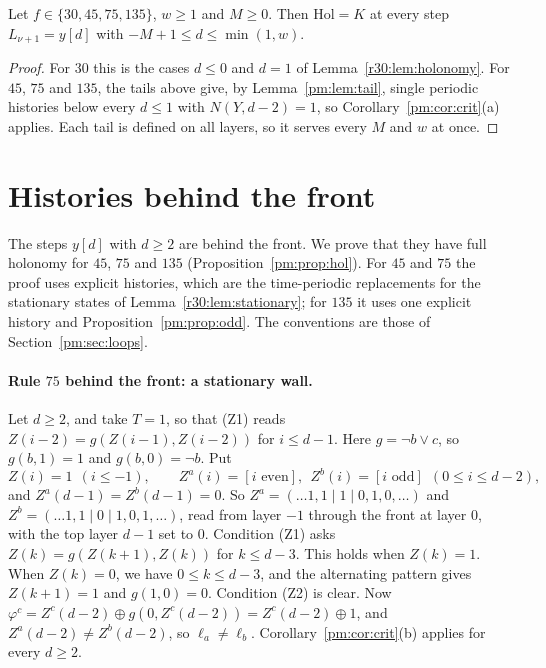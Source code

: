 \begin{proposition}\label{pm:prop:ahead}
Let $f\in\{30,45,75,135\}$, $w\ge1$ and $M\ge0$. Then $\mathrm{Hol}=K$ at every step $L_{\nu+1}=y[d]$ with $-M+1\le d\le\min(1,w)$.
\end{proposition}

\begin{proof}
For $30$ this is the cases $d\le0$ and $d=1$ of Lemma~\ref{r30:lem:holonomy}. For $45$, $75$ and $135$, the tails above give, by Lemma~\ref{pm:lem:tail}, single periodic histories below every $d\le1$ with $N(Y,d-2)=1$, so Corollary~\ref{pm:cor:crit}(a) applies. Each tail is defined on all layers, so it serves every $M$ and $w$ at once.
\end{proof}

\section{Histories behind the front}\label{pm:sec:behind}

The steps $y[d]$ with $d\ge2$ are behind the front. We prove that they have full holonomy for $45$, $75$ and $135$ (Proposition~\ref{pm:prop:hol}). For $45$ and $75$ the proof uses explicit histories, which are the time-periodic replacements for the stationary states of Lemma~\ref{r30:lem:stationary}; for $135$ it uses one explicit history and Proposition~\ref{pm:prop:odd}. The conventions are those of Section~\ref{pm:sec:loops}.

\paragraph{Rule $75$ behind the front: a stationary wall.} Let $d\ge2$, and take $T=1$, so that (Z1) reads $Z(i-2)=g(Z(i-1),Z(i-2))$ for $i\le d-1$. Here $g=\neg b\vee c$, so $g(b,1)=1$ and $g(b,0)=\neg b$. Put
\[
Z(i)=1\ \ (i\le-1),\qquad Z^a(i)=[i\text{ even}],\ \ Z^b(i)=[i\text{ odd}]\ \ (0\le i\le d-2),
\]
and $Z^a(d-1)=Z^b(d-1)=0$.
So $Z^a=(\dots1,1\mid1\mid0,1,0,\dots)$ and $Z^b=(\dots1,1\mid0\mid1,0,1,\dots)$, read from layer $-1$ through the front at layer $0$, with the top layer $d-1$ set to $0$. Condition (Z1) asks $Z(k)=g(Z(k+1),Z(k))$ for $k\le d-3$. This holds when $Z(k)=1$. When $Z(k)=0$, we have $0\le k\le d-3$, and the alternating pattern gives $Z(k+1)=1$ and $g(1,0)=0$. Condition (Z2) is clear. Now $\varphi^c=Z^c(d-2)\oplus g(0,Z^c(d-2))=Z^c(d-2)\oplus1$, and $Z^a(d-2)\ne Z^b(d-2)$, so $\ell_a\ne\ell_b$. Corollary~\ref{pm:cor:crit}(b) applies for every $d\ge2$.

